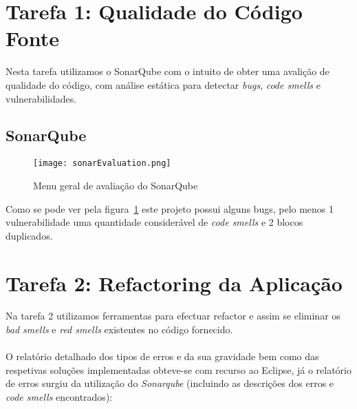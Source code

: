 \section{Tarefa 1: Qualidade do Código Fonte}
Nesta tarefa utilizamos o SonarQube com o intuito de obter uma avalição de qualidade do código, com análise estática para detectar \textit{bugs}, \textit{code smells} e vulnerabilidades.

\subsection{SonarQube}

\begin{figure}[H]

  \centering

  \texttt{[image: sonarEvaluation.png]}

  \caption {Menu geral de avaliação do SonarQube}

  \label {fig01}

\end{figure}


\par Como se pode ver pela figura~\ref{fig01} este projeto possui alguns bugs, pelo menos 1 vulnerabilidade uma quantidade considerável de \textit{code smells} e 2 blocos duplicados.

\section{Tarefa 2: Refactoring da Aplicação}

Na tarefa 2 utilizamos ferramentas para efectuar refactor e assim se eliminar os \textit{bad smells} e \textit{red smells} existentes no
código fornecido.\\
\\
O relatório detalhado dos tipos de erros e da sua gravidade bem como das respetivas soluções implementadas obteve-se com  
recurso ao Eclipse, já o relatório de erros surgiu da utilização do \textit{Sonarqube} (incluindo as descrições dos erros e \textit{code smells} encontrados):

